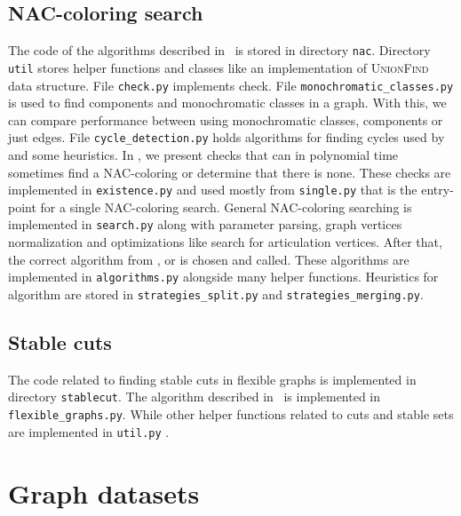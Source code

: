 \subsection{NAC-coloring search}

The code of the algorithms described in~
is stored in directory \texttt{nac}.
%
Directory \texttt{util} stores helper functions and classes
like an implementation of \textsc{UnionFind} data structure.
%
File \texttt{check.py} implements \IsNACColoring{} check.
%
File \texttt{monochromatic\_classes.py} is used to find \trcon{} components
and monochromatic classes in a graph. With this, we can compare performance
between using monochromatic classes, \trcon{} components or just edges.
%
File \texttt{cycle\_detection.py} holds algorithms for finding cycles
used by 
and some heuristics.
%
In ,
we present checks that can in polynomial time
sometimes find a NAC-coloring or determine that there is none.
These checks are implemented in \texttt{existence.py} and
used mostly from \texttt{single.py} that is the entry-point
for a single NAC-coloring search.
%
General NAC-coloring searching is implemented in \texttt{search.py}
along with parameter parsing, graph vertices normalization and
optimizations like search for articulation vertices.
After that, the correct algorithm from \Naive{}, \NaiveCycles{} or \Subgraphs{}
is chosen and called.
%
These algorithms are implemented in \texttt{algorithms.py} alongside many helper functions.
Heuristics for \Subgraphs{} algorithm are stored in \texttt{strategies\_split.py}
and \texttt{strategies\_merging.py}.


\subsection{Stable cuts}

The code related to finding stable cuts in flexible graphs
is implemented in directory \texttt{stablecut}.
%
The algorithm described in~
is implemented in \texttt{flexible\_graphs.py}.
While other helper functions related to cuts and stable sets
are implemented in \texttt{util.py}%
.


\section{Graph datasets}

